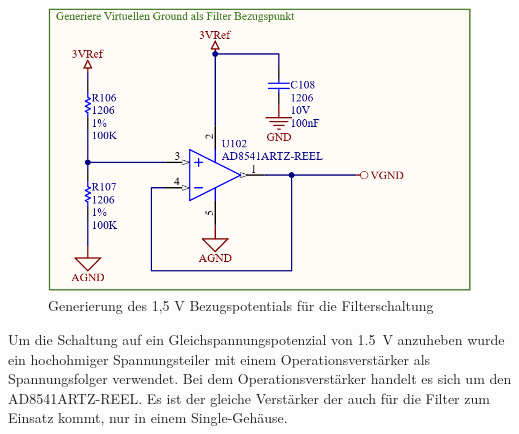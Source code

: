 \begin{figure} [!h]
	\includegraphics[width=\textwidth] {EKG_virtueller_Ground.png}
	\caption{Generierung des 1,5 V Bezugspotentials für die Filterschaltung}
	\label{fig5} 
\end{figure}

Um die Schaltung auf ein Gleichspannungspotenzial von \SI{1,5}{\volt} anzuheben wurde ein hochohmiger Spannungsteiler mit einem Operationsverstärker als Spannungsfolger verwendet. Bei dem Operationsverstärker handelt es sich um den AD8541ARTZ-REEL. Es ist der gleiche Verstärker der auch für die Filter zum Einsatz kommt, nur in einem Single-Gehäuse.




